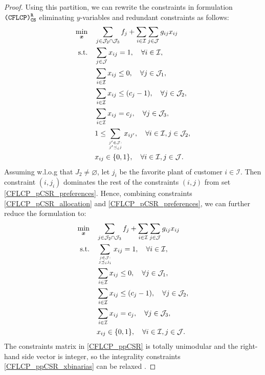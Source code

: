 \documentclass[preprint,11pt,authoryear]{elsarticle}
\let\emptyset\varnothing
\def\J{\mathcal{J}}
\def\I{\mathcal{I}}
\begin{document}
\begin{proof}
    Using this partition, we can rewrite the constraints in formulation ${\normalfont\texttt{(CFLCP)}_{\texttt{CS}}^\texttt{R}}$ eliminating $y$-variables and redundant constraints as follows:
    \begin{subequations} \label{CFLCP_pCSR}
\begin{align}
\min_{\boldsymbol{x}}\quad & \sum_{j\in \J_2\cap \J_3} f_j + \sum_{i\in \I} \sum_{j\in \J} g_{ij}x_{ij}  \label{CFLCP_pCSR_FO} \\
\text{s.t.} \quad &\sum_{j\in \J} x_{ij} = 1, \quad \forall i\in \I, \label{CFLCP_pCSR_allocation}\\
& \sum_{i\in \I} x_{ij}  \le 0, \quad \forall j\in\J_1, \label{CFLCP_pCSR_capacityJ1}\\
& \sum_{i\in \I} x_{ij}  \le (c_j-1), \quad \forall j\in\J_2, \label{CFLCP_pCSR_capacityJ2}\\
& \sum_{i\in \I} x_{ij}  = c_j, \quad \forall j\in\J_3, \label{CFLCP_pCSR_capacityJ3}\\
&  1 \le  \sum_{j'\in \J:\atop j'\preceq_i j} x_{ij'}, \quad \forall i\in \I, j\in \J_2, \label{CFLCP_pCSR_preferences} \\
& x_{ij} \in \{0,1\}, \quad \forall i \in \I, j \in \J.  \label{CFLCP_pCSR_xbinarias} 
\end{align}
\end{subequations}
Assuming w.l.o.g that $J_2\neq \emptyset$, let $j_i$ be the favorite plant of customer $i\in \I$. Then constraint $(i,j_i)$ dominates the rest of the constraints $(i,j)$ from set  \eqref{CFLCP_pCSR_preferences}. Hence, combining constraints \eqref{CFLCP_pCSR_allocation} and \eqref{CFLCP_pCSR_preferences}, we can further reduce the formulation to:
    \begin{subequations} \label{CFLCP_ppCSR}
\begin{align}
\min_{\boldsymbol{x}} \quad & \sum_{j\in \J_2\cap \J_3} f_j + \sum_{i\in \I} \sum_{j\in \J} g_{ij}x_{ij}  \label{CFLCP_ppCSR_FO} \\
\text{s.t.} \quad &\sum_{j\in \J:\atop j \preceq_i j_i} x_{ij} = 1, \quad \forall i\in \I, \label{CFLCP_ppCSR_allocation}\\
& \sum_{i\in \I} x_{ij}  \le 0, \quad \forall j\in\J_1, \label{CFLCP_ppCSR_capacityJ1}\\
& \sum_{i\in \I} x_{ij}  \le (c_j-1), \quad \forall j\in\J_2, \label{CFLCP_ppCSR_capacityJ2}\\
& \sum_{i\in \I} x_{ij}  = c_j, \quad \forall j\in\J_3, \label{CFLCP_ppCSR_capacityJ3}\\
& x_{ij} \in \{0,1\}, \quad \forall i \in \I, j \in \J.  \label{CFLCP_ppCSR_xbinarias} 
\end{align}
\end{subequations}
The constraints matrix in \eqref{CFLCP_ppCSR} is totally unimodular \cite[Corollary 2.8. for the partition of rows given by constraints $\{\eqref{CFLCP_ppCSR_allocation}$ and $\{\eqref{CFLCP_ppCSR_capacityJ1}-\eqref{CFLCP_ppCSR_capacityJ3}\}$]{wolsey1999integer} and the right-hand side vector is integer, so the integrality constraints \eqref{CFLCP_ppCSR_xbinarias} can be relaxed \cite[Proposition 2.3.]{wolsey1999integer}.
\end{proof}
\end{document}
